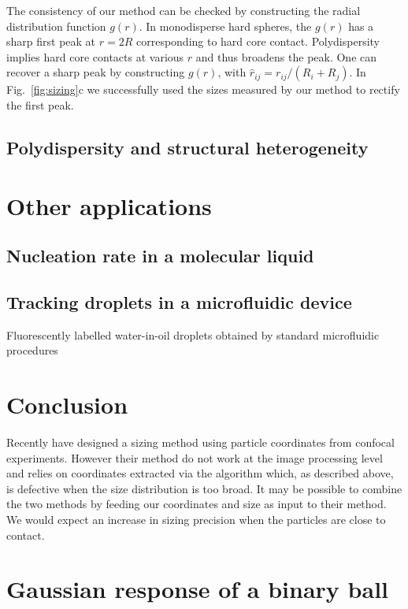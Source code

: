 \documentclass[8.5pt,twoside,twocolumn]{article}
\begin{document}
The consistency of our method can be checked by constructing the radial distribution function $g(r)$. In monodisperse hard spheres, the $g(r)$ has a sharp first peak at $r=2R$ corresponding to hard core contact. Polydispersity implies hard core contacts at various $r$ and thus broadens the peak. One can recover a sharp peak by constructing $g(\hat{r})$, with $\hat{r}_{ij} = r_{ij}/(R_i+R_j)$. In Fig.~\ref{fig:sizing}c we successfully used the sizes measured by our method to rectify the first peak.

\subsection*{Polydispersity and structural heterogeneity}

\section*{Other applications}

\subsection*{Nucleation rate in a molecular liquid}

\subsection*{Tracking droplets in a microfluidic device}

Fluorescently labelled water-in-oil droplets obtained by standard microfluidic procedures~\cite{Montagne2011}

\section*{Conclusion}
Recently \citet{Kurita2011,Kurita2011b} have designed a sizing method using particle coordinates from confocal experiments. However their method do not work at the image processing level and relies on coordinates extracted via the \citet{Crocker1996} algorithm which, as described above, is defective when the size distribution is too broad. It may be possible to combine the two methods by feeding our coordinates and size as input to their method. We would expect an increase in sizing precision when the particles are close to contact.

\appendix

\section{Gaussian response of a binary ball}
\label{sec:gaussian_vs_ball}
\end{document}

